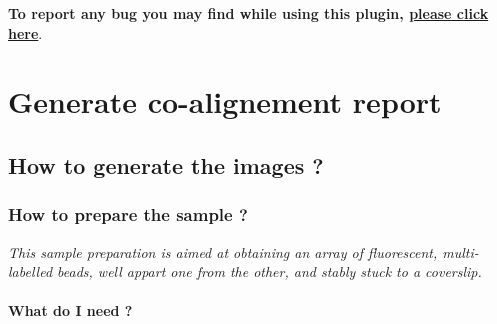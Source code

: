\documentclass[a4paper, 11pt]{report}%
\makeatletter
\newcommand{\mailbug}{\begin{center}\textbf{To report any bug you may find while using this plugin, \href{mailto:fabrice.cordelieres@gmail.com,cedric.matthews@ibdml.univ-mrs.fr ?subject=Bug\%20found\%20in\%20MetroloJ&body=\%0ABug\%20description:\%0A\%0AHow\%20did\%20it\%20happen:\%0A\%0ACopy/Paste\%20the\%20content\%20of\%20the\%20log\%20window\%0A\%0AVersion\%20of\%20ImageJ:\%0A\%0AVersion\%20of\%20Java:}{please click here}}.\end{center}}
\makeatother
\begin{document}
\mailbug

\chapter{Generate co-alignement report}
\label{chap:gcoar}

\section{How to generate the images ?}
\label{sec:gcoar-what}

\subsection{How to prepare the sample ?}
\label{sec:gcoar-proto}

\textit{This sample preparation is aimed at obtaining an array of fluorescent, multi-labelled beads, well appart one from the other, and stably stuck to a coverslip.}

\subsubsection{What do I need ?}
\label{sec:gcoar-proto-what}
\end{document}
